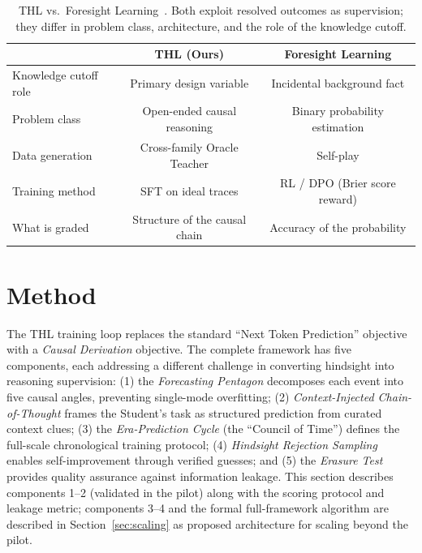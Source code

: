 \documentclass[11pt,a4paper]{article}
\begin{document}
\begin{table}[h]
\centering\small
\begin{tabular}{lcc}
\toprule
 & \textbf{THL (Ours)} & \textbf{Foresight Learning} \\
\midrule
Knowledge cutoff role & Primary design variable & Incidental background fact \\
Problem class & Open-ended causal reasoning & Binary probability estimation \\
Data generation & Cross-family Oracle Teacher & Self-play \\
Training method & SFT on ideal traces & RL / DPO (Brier score reward) \\
What is graded & Structure of the causal chain & Accuracy of the probability \\
\bottomrule
\end{tabular}
\caption{THL vs.\ Foresight Learning~\cite{turtel2025selfteach, turtel2025rlvr, turtel2026futureaslabel}. Both exploit resolved outcomes as supervision; they differ in problem class, architecture, and the role of the knowledge cutoff.}
\label{tab:comparison}
\end{table}

\section{Method}

The THL training loop replaces the standard ``Next Token Prediction'' objective with a \textit{Causal Derivation} objective. The complete framework has five components, each addressing a different challenge in converting hindsight into reasoning supervision: (1) the \emph{Forecasting Pentagon} decomposes each event into five causal angles, preventing single-mode overfitting; (2) \emph{Context-Injected Chain-of-Thought} frames the Student's task as structured prediction from curated context clues; (3) the \emph{Era-Prediction Cycle} (the ``Council of Time'') defines the full-scale chronological training protocol; (4) \emph{Hindsight Rejection Sampling} enables self-improvement through verified guesses; and (5) the \emph{Erasure Test} provides quality assurance against information leakage. This section describes components 1--2 (validated in the pilot) along with the scoring protocol and leakage metric; components 3--4 and the formal full-framework algorithm are described in Section~\ref{sec:scaling} as proposed architecture for scaling beyond the pilot.
\end{document}
